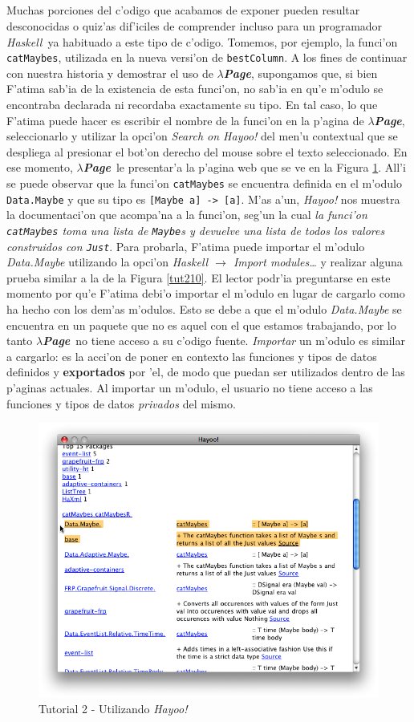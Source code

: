 \documentclass[a4paper]{article}
\newcommand{\haskell}{\textsl{Haskell}}
\newcommand{\hpage}{\textbf{\textsl{$\lambda$Page}}}
\begin{document}
\subparagraph{} Muchas porciones del c'odigo que acabamos de exponer pueden resultar desconocidas o quiz'as dif'iciles de comprender incluso para un programador \haskell\ ya habituado a este tipo de c'odigo.  Tomemos, por ejemplo, la funci'on \texttt{catMaybes}, utilizada en la nueva versi'on de \texttt{bestColumn}.  A los fines de continuar con nuestra historia y demostrar el uso de \hpage, supongamos que, si bien F'atima sab'ia de la existencia de esta funci'on, no sab'ia en qu'e m'odulo se encontraba declarada ni recordaba exactamente su tipo.  En tal caso, lo que F'atima puede hacer es escribir el nombre de la funci'on en la p'agina de \hpage, seleccionarlo y utilizar la opci'on \textsl{Search on Hayoo!} del men'u contextual que se despliega al presionar el bot'on derecho del mouse sobre el texto seleccionado.  En ese momento, \hpage\ le presentar'a la p'agina web que se ve en la Figura \ref{tut209}. All'i se puede observar que la funci'on \texttt{catMaybes} se encuentra definida en el m'odulo \texttt{Data.Maybe} y que su tipo es \texttt{[Maybe a] -> [a]}.  M'as a'un, \textsl{Hayoo!} nos muestra la documentaci'on que acompa'na a la funci'on, seg'un la cual \textit{la funci'on \texttt{catMaybes} toma una lista de \texttt{Maybe}s y devuelve una lista de todos los valores construidos con \texttt{Just}}.  Para probarla, F'atima puede importar el m'odulo \textsl{Data.Maybe} utilizando la opci'on \textsl{Haskell $\rightarrow$ Import modules\ldots} y realizar alguna prueba similar a la de la Figura \ref{tut210}.  El lector podr'ia preguntarse en este momento por qu'e F'atima debi'o importar el m'odulo en lugar de cargarlo como ha hecho con los dem'as m'odulos.  Esto se debe a que el m'odulo \textsl{Data.Maybe} se encuentra en un paquete que no es aquel con el que estamos trabajando, por lo tanto \hpage\ no tiene acceso a su c'odigo fuente.  \textsl{Importar} un m'odulo es similar a cargarlo: es la acci'on de poner en contexto las funciones y tipos de datos definidos y \textbf{exportados} por 'el, de modo que puedan ser utilizados dentro de las p'aginas actuales.  Al importar un m'odulo, el usuario no tiene acceso a las funciones y tipos de datos \textsl{privados} del mismo.
\begin{figure}[hp]
	\begin{center}
        	\includegraphics[width=.75\textwidth]{pictures/tut2/09}
		\caption{Tutorial 2 - Utilizando \textsl{Hayoo!}}
		\label{tut209}
	\end{center}
\end{figure}
\end{document}
